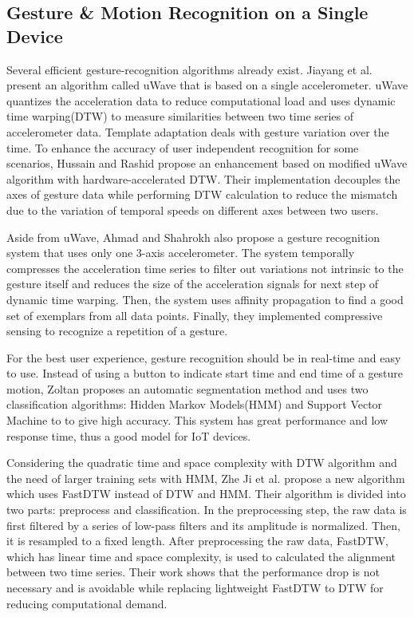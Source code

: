 
\subsection{Gesture \& Motion Recognition on a Single Device}

Several efficient gesture-recognition algorithms already exist. Jiayang et al. \cite{Liu:2009, LiuuWave} present an algorithm called uWave that is based on a single accelerometer. uWave quantizes the acceleration data to reduce computational load and uses dynamic time warping(DTW) to measure similarities between two time series of accelerometer data. Template adaptation deals with gesture variation over the time. To enhance the accuracy of user independent recognition for some scenarios, Hussain and Rashid \cite{Hussain:2012} propose an enhancement based on modified uWave algorithm with hardware-accelerated DTW. Their implementation decouples the axes of gesture data while performing DTW calculation to reduce the mismatch due to the variation of temporal speeds on different axes between two users. 

Aside from uWave, Ahmad and Shahrokh \cite{Ahmad:2010} also propose a gesture recognition system that uses only one 3-axis accelerometer. The system temporally compresses the acceleration time series to filter out variations not intrinsic to the gesture itself and reduces the size of the acceleration signals for next step of dynamic time warping. Then, the system uses affinity propagation to find a good set of exemplars from all data points. Finally, they implemented compressive sensing to recognize a repetition of a gesture. 

For the best user experience, gesture recognition should be in real-time and easy to use. Instead of using a button to indicate start time and end time of a gesture motion, Zoltan \cite{Zoltan} proposes an automatic segmentation method and uses two classification algorithms: Hidden Markov Models(HMM) and Support Vector Machine to to give high accuracy. This system has great performance and low response time, thus a good model for \gls{IoT} devices.

Considering the quadratic time and space complexity with DTW algorithm and the need of larger training sets with HMM, Zhe Ji et al. \cite{Ji:2015} propose a new algorithm which uses FastDTW instead of DTW and HMM. Their algorithm is divided into two parts: preprocess and classification. In the preprocessing step, the raw data is first filtered by a series of low-pass filters and its amplitude is normalized. Then, it is resampled to a fixed length. After preprocessing the raw data, FastDTW, which has linear time and space complexity, is used to calculated the alignment between two time series. Their work shows that the performance drop is not necessary and is avoidable while replacing lightweight FastDTW to DTW for reducing computational demand.